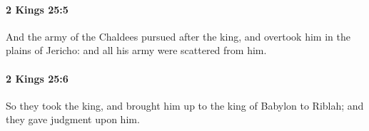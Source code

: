 		\paragraph{2 Kings 25:5} %
			\label{2KINGS-25-5}

			And the army of the Chaldees pursued after the king, and overtook him in the plains of Jericho: and all his army were scattered from him.


		\paragraph{2 Kings 25:6} %
			\label{2KINGS-25-6}

			So they took the king, and brought him up to the king of Babylon to Riblah; and they gave judgment upon him.


